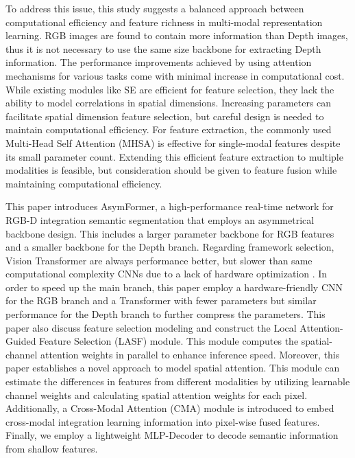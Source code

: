 \documentclass[letterpaper, 10 pt, conference]{ieeeconf}
\begin{document}
To address this issue, this study suggests a balanced approach between computational efficiency and feature richness in multi-modal representation learning. RGB images are found to contain more information than Depth images, thus it is not necessary to use the same size backbone for extracting Depth information. The performance improvements achieved by using attention mechanisms for various tasks come with minimal increase in computational cost. While existing modules like SE \cite{hu2018squeeze} are efficient for feature selection, they lack the ability to model correlations in spatial dimensions. Increasing parameters can facilitate spatial dimension feature selection, but careful design is needed to maintain computational efficiency. For feature extraction, the commonly used Multi-Head Self Attention (MHSA) \cite{dosovitskiy2020image} is effective for single-modal features despite its small parameter count. Extending this efficient feature extraction to multiple modalities is feasible, but consideration should be given to feature fusion while maintaining computational efficiency.



This paper introduces AsymFormer, a high-performance real-time network for RGB-D integration semantic segmentation that employs an asymmetrical backbone design. This includes a larger parameter backbone for RGB features and a smaller backbone for the Depth branch. Regarding framework selection, Vision Transformer are always performance better, but slower than same computational complexity CNNs due to a lack of hardware optimization \cite{li2022next}. In order to speed up the main branch, this paper employ a hardware-friendly CNN \cite{liu2022convnet} for the RGB branch and a Transformer \cite{xie2021segformer} with fewer parameters but similar performance for the Depth branch to further compress the parameters. This paper also discuss feature selection modeling and construct the Local Attention-Guided Feature Selection (LASF) module. This module computes the spatial-channel attention weights in parallel to enhance inference speed. Moreover, this paper establishes a novel approach to model spatial attention. This module can estimate the differences in features from different modalities by utilizing learnable channel weights and calculating spatial attention weights for each pixel. Additionally, a Cross-Modal Attention (CMA) module is introduced to embed cross-modal integration learning information into pixel-wise fused features. Finally, we employ a lightweight MLP-Decoder\cite{xie2021segformer} to decode semantic information from shallow features.
\end{document}

